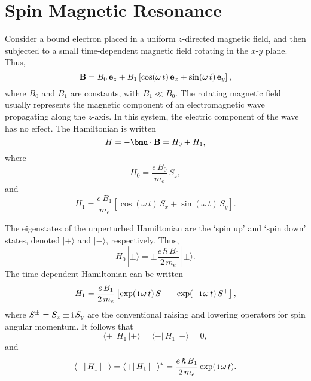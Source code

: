 \section{Spin Magnetic Resonance}
Consider a bound electron placed in a
uniform $z$-directed magnetic field, and then subjected to a small time-dependent magnetic field rotating in the $x$-$y$ plane. 
Thus,
\begin{equation}
{\bf B} = B_0\, {\bf e}_z + B_1\left[\cos(\omega\, t) \,{\bf e}_x + \sin(\omega \,t)
\,{\bf e}_y\right],
\end{equation}
where $B_0$ and $B_1$ are constants, with $B_1\ll B_0$. The rotating magnetic
field usually  represents the magnetic component of an
electromagnetic wave propagating along the $z$-axis. In this system, the
electric component of the wave has no effect.
The Hamiltonian is written
\begin{equation}
H = - \bmu \cdot {\bf B} = H_0 + H_1,
\end{equation}
where
\begin{equation}
H_0 = \frac{e\,B_0}{m_e}\, S_z,
\end{equation}
and 
\begin{equation}
H_1 = \frac{e\, B_1}{m_e} \left[\cos(\omega\, t) \,S_x + \sin(\omega\, t)\, S_y\right].
\end{equation}

The eigenstates of the unperturbed Hamiltonian are the `spin up' and
`spin down' states, denoted $|+\rangle$ and $|-\rangle$, respectively.
Thus,
\begin{equation}
H_0 \,|\pm \rangle = \pm \frac{e\, \hbar\, B_0}{2 \,m_e} \,|\pm \rangle.
\end{equation}
The time-dependent Hamiltonian can be written
\begin{equation}
H_1 = \frac{e\, B_1}{2 \,m_e} \left[\exp(\,{\rm i}\,\omega \,t)\, S^- + 
\exp(-{\rm i}\,\omega\, t)\, S^+\right],
\end{equation}
where $S^\pm=S_x\pm {\rm i}\,S_y$ are the conventional raising and lowering operators
for  spin angular momentum. It follows that
\begin{equation}
\langle + |\,H_1\, |+\rangle = \langle - |\,H_1\,|-\rangle = 0,
\end{equation}
and
\begin{equation}
\langle - |\,H_1\,| + \rangle = \langle + |\,H_1\,| - \rangle^\ast = 
\frac{e \,\hbar \,B_1}{2\, m_e} \exp(\,{\rm i}\,\omega\, t).
\end{equation}

